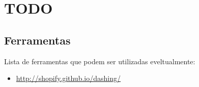 \section{TODO}

\subsection{Ferramentas}

Lista de ferramentas que podem ser utilizadas eveltualmente:

\begin{itemize}
\item
  \url{http://shopify.github.io/dashing/}
\end{itemize}

